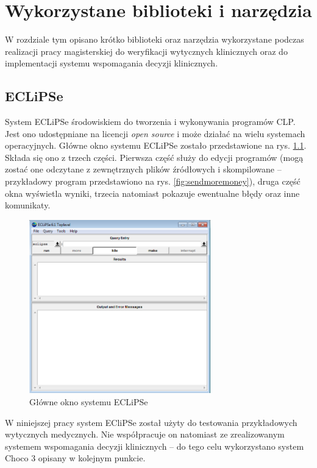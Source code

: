 \chapter{Wykorzystane biblioteki i narzędzia}

W rozdziale tym opisano krótko biblioteki oraz narzędzia wykorzystane podczas realizacji pracy magisterskiej do weryfikacji wytycznych klinicznych oraz do implementacji systemu wspomagania decyzji klinicznych. 

\section{ECLiPSe}
\label{sec:eclipse}

System ECLiPSe \cite{EclipseSite} środowiskiem do tworzenia i wykonywania programów CLP. Jest ono udostępniane na licencji \textit{open source} i może działać na wielu systemach operacyjnych. Główne okno systemu ECLiPSe zostało przedstawione na rys. \ref{fig:eclipse}. Składa się ono z trzech części. Pierwsza część służy do edycji programów (mogą zostać one odczytane z zewnętrznych plików źródłowych i skompilowane -- przykładowy program przedstawiono na rys. \ref{fig:sendmoremoney}), druga część okna wyświetla wyniki, trzecia natomiast pokazuje ewentualne błędy oraz inne komunikaty.
 
\begin{figure}[H]
\centering
\includegraphics[width=0.7\textwidth]{img/okno.png}
\caption{Główne okno systemu ECLiPSe}
\label{fig:eclipse}
\end{figure}

W niniejszej pracy system ECliPSe został użyty do testowania przykładowych wytycznych medycznych. Nie współpracuje on natomiast ze zrealizowanym systemem wspomagania decyzji klinicznych -- do tego celu wykorzystano system Choco 3 opisany w kolejnym punkcie. 

